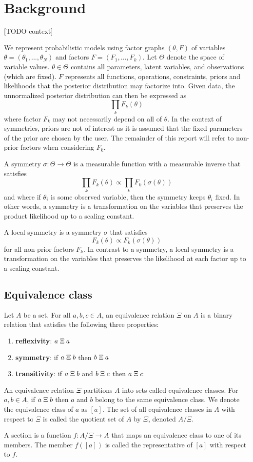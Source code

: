 

\section{Background}

[TODO context]

We represent probabilistic models using factor graphs $(\theta,F)$ of variables $\theta=(\theta_1,...,\theta_N)$ and factors $F=(F_1,...,F_k)$. Let $\Theta$ denote the space of variable values. $\theta\in\Theta$ contains all parameters, latent variables, and observations (which are fixed). $F$ represents all functions, operations, constraints, priors and likelihoods that the posterior distribution may factorize into. Given data, the unnormalized posterior distribution can then be expressed as
\[
\prod_kF_k(\theta)
\]
where factor $F_k$ may not necessarily depend on all of $\theta$. In the context of symmetries, priors are not of interest as it is assumed that the fixed parameters of the prior are chosen by the user. The remainder of this report will refer to non-prior factors when considering $F_k$.

A symmetry $\sigma:\Theta\rightarrow\Theta$ is a measurable function with a measurable inverse that satisfies
\[
\prod_kF_k(\theta) \propto \prod_kF_k(\sigma(\theta))
\]
and where if $\theta_i$ is some observed variable, then the symmetry keeps $\theta_i$ fixed. In other words, a symmetry is a transformation on the variables that preserves the product likelihood up to a scaling constant.

A local symmetry is a symmetry $\sigma$ that satisfies
\[
F_k(\theta) \propto F_k\left(\sigma(\theta)\right)
\]
for all non-prior factors $F_k$. In contrast to a symmetry, a local symmetry is a transformation on the variables that preserves the likelihood at each factor up to a scaling constant.

\subsection{Equivalence class}

Let $A$ be a set. For all $a,b,c\in A$, an equivalence relation $\Xi$ on $A$ is a binary relation that satisfies the following three properties:
\begin{enumerate}

\item
\textbf{reflexivity}: $a\;\Xi\; a$

\item
\textbf{symmetry}: if $a\;\Xi\; b$ then $b\;\Xi\; a$

\item
\textbf{transitivity}: if $a\;\Xi\; b$ and $b\;\Xi\; c$ then $a\;\Xi\; c$

\end{enumerate}
An equivalence relation $\Xi$ partitions $A$ into sets called equivalence classes. For $a,b\in A$, if $a\;\Xi\; b$ then $a$ and $b$ belong to the same equivalence class. We denote the equivalence class of $a$ as $[a]$. The set of all equivalence classes in $A$ with respect to $\Xi$ is called the quotient set of $A$ by $\Xi$, denoted $A/\Xi$.

A section is a function $f:A/\Xi\rightarrow A$ that maps an equivalence class to one of its members. The member $f([a])$ is called the representative of $[a]$ with respect to $f$.

